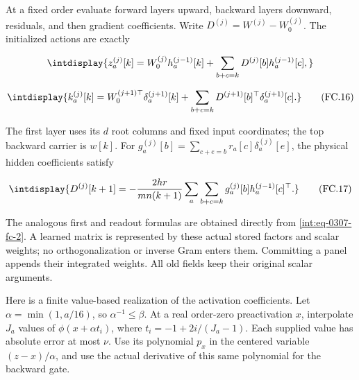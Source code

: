 
At a fixed order evaluate forward layers upward, backward layers downward, residuals, and then gradient coefficients. Write \(D^{(j)}=W^{(j)}-W_0^{(j)}\). The initialized actions are exactly


\begingroup\renewcommand{\theHequation}{intdisplay.712}
\begin{equation*}
\intdisplay{
z_a^{(j)}[k]=W_0^{(j)}h_a^{(j-1)}[k]
+\sum_{b+c=k}D^{(j)}[b]h_a^{(j-1)}[c],
}
\end{equation*}
\endgroup

\begingroup\renewcommand{\theHequation}{intdisplay.713}
\begin{equation}
\intdisplay{
k_a^{(j)}[k]=W_0^{(j+1)\top}\delta_a^{(j+1)}[k]
+\sum_{b+c=k}D^{(j+1)}[b]^\top\delta_a^{(j+1)}[c].
}
\tag{FC.16}
\label{int:eq-0321-fc-16}
\end{equation}
\endgroup


The first layer uses its \(d\) root columns and fixed input coordinates; the top backward carrier is \(w[k]\). For \(g_a^{(j)}[b]=\sum_{c+e=b}r_a[c]\delta_a^{(j)}[e]\), the physical hidden coefficients satisfy


\begingroup\renewcommand{\theHequation}{intdisplay.714}
\begin{equation}
\intdisplay{
D^{(j)}[k+1]=-
\frac{2hr}{mn(k+1)}\sum_a\sum_{b+c=k}
g_a^{(j)}[b]h_a^{(j-1)}[c]^\top.
}
\tag{FC.17}
\label{int:eq-0322-fc-17}
\end{equation}
\endgroup


The analogous first and readout formulas are obtained directly from \eqref{int:eq-0307-fc-2}. A learned matrix is represented by these actual stored factors and scalar weights; no orthogonalization or inverse Gram enters them. Committing a panel appends their integrated weights. All old fields keep their original scalar arguments.



Here is a finite value-based realization of the activation coefficients. Let \(\alpha=\min(1,\allowbreak a/16)\), so \(\alpha^{-1}\le\beta\). At a real order-zero preactivation \(x\), interpolate \(J_a\) values of \(\phi(x+\alpha t_i)\), where \(t_i=-1+2i/(J_a-1)\). Each supplied value has absolute error at most \(\nu\). Use its polynomial \(p_x\) in the centered variable \((z-x)/\alpha\), and use the actual derivative of this same polynomial for the backward gate.


